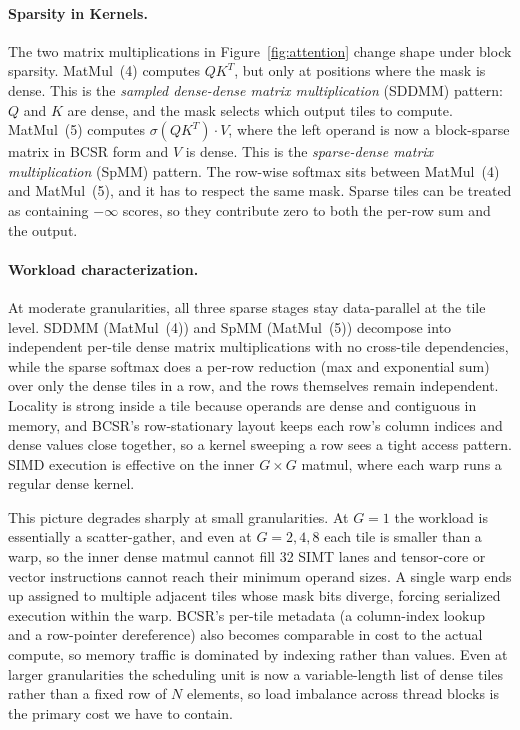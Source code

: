 \documentclass[11pt]{article}
\begin{document}
\paragraph{Sparsity in Kernels.}
The two matrix multiplications in Figure~\ref{fig:attention} change shape under block sparsity. MatMul~(4) computes $QK^T$, but only at positions where the mask is dense. This is the \emph{sampled dense-dense matrix multiplication} (SDDMM) pattern: $Q$ and $K$ are dense, and the mask selects which output tiles to compute. MatMul~(5) computes $\sigma(QK^T) \cdot V$, where the left operand is now a block-sparse matrix in BCSR form and $V$ is dense. This is the \emph{sparse-dense matrix multiplication} (SpMM) pattern. The row-wise softmax sits between MatMul~(4) and MatMul~(5), and it has to respect the same mask. Sparse tiles can be treated as containing $-\infty$ scores, so they contribute zero to both the per-row sum and the output. 

\paragraph{Workload characterization.}
At moderate granularities, all three sparse stages stay data-parallel at the tile level. SDDMM (MatMul~(4)) and SpMM (MatMul~(5)) decompose into independent per-tile dense matrix multiplications with no cross-tile dependencies, while the sparse softmax does a per-row reduction (max and exponential sum) over only the dense tiles in a row, and the rows themselves remain independent. Locality is strong inside a tile because operands are dense and contiguous in memory, and BCSR's row-stationary layout keeps each row's column indices and dense values close together, so a kernel sweeping a row sees a tight access pattern. SIMD execution is effective on the inner $G \times G$ matmul, where each warp runs a regular dense kernel.

This picture degrades sharply at small granularities. At $G=1$ the workload is essentially a scatter-gather, and even at $G=2, 4, 8$ each tile is smaller than a warp, so the inner dense matmul cannot fill 32 SIMT lanes and tensor-core or vector instructions cannot reach their minimum operand sizes. A single warp ends up assigned to multiple adjacent tiles whose mask bits diverge, forcing serialized execution within the warp. BCSR's per-tile metadata (a column-index lookup and a row-pointer dereference) also becomes comparable in cost to the actual compute, so memory traffic is dominated by indexing rather than values. Even at larger granularities the scheduling unit is now a variable-length list of dense tiles rather than a fixed row of $N$ elements, so load imbalance across thread blocks is the primary cost we have to contain.
\end{document}
